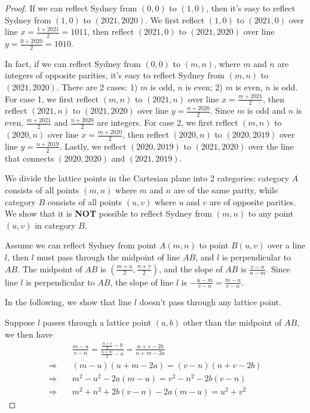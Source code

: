\documentclass[11pt, oneside]{article}   	%
\begin{document}
\begin{proof}
If we can reflect Sydney from $(0, 0)$ to $(1, 0)$, then it's easy to reflect Sydney from $(1, 0)$ to $(2021, 2020)$. We first reflect $(1, 0)$ to $(2021, 0)$ over line $x= \frac{1+ 2021}{2}= 1011$, then reflect $(2021, 0)$ to $(2021, 2020)$ over line $y=\frac{0+ 2020}{2}= 1010$.

In fact, if we can reflect Sydney from $(0, 0)$ to $(m, n)$, where $m$ and $n$ are integers of opposite parities, it's easy to reflect Sydney from $(m, n)$ to $(2021, 2020)$.  There are 2 cases: 1) $m$ is odd, $n$ is even; 2) $m$ is even, $n$ is odd. For case 1, we first reflect $(m, n)$ to $(2021, n)$ over line $x= \frac{m+ 2021}{2}$, then reflect $(2021, n)$ to $(2021, 2020)$ over line $y=\frac{n+ 2020}{2}$. Since $m$ is  odd and $n$ is even, $\frac{m+ 2021}{2}$ and $\frac{n+ 2020}{2}$ are integers. For case 2, we first reflect $(m, n)$ to $(2020, n)$ over line  $x= \frac {m+ 2020}{2}$, then reflect $(2020, n)$ to $(2020, 2019)$ over line $y= \frac{n +2019}{2}$. Lastly, we reflect $(2020, 2019)$ to $(2021, 2020)$ over the line that connects $(2020, 2020)$ and $(2021, 2019)$. 

We divide the lattice points in the Cartesian plane into 2 categories: category $A$ consists of all points $(m, n)$ where $m$ and $n$ are of the same parity, while category $B$ consists of all points $(u, v)$ where $u$ and $v$ are of opposite parities. We show that it is \textbf{NOT}  possible to reflect Sydney from $(m, n)$ to any point $(u, v)$ in category $B$.

Assume we can reflect Sydney from point $A (m, n)$ to point $B (u, v)$ over a line $l$, then $l$ must pass through the midpoint of line $AB$, and $l$ is perpendicular to $AB$. The midpoint of $AB$ is $(\frac{m+u}{2}, \frac{n+v}{2})$, and the slope of $AB$ is $\frac{v-n}{u-m}$. Since line $l$ is perpendicular to $AB$, the slope of line $l$ is $-\frac{u-m}{v-n}=\frac{m-u}{v-n}$. 

In the following, we show that line $l$ doesn't pass through any lattice point.

Suppose $l$ passes through a lattice point $(a, b)$ other than the midpoint of $AB$, we then have 
\begin{align*}
&\frac{m-u}{v-n}= \frac{\frac{n+v}{2}-b} {\frac{u+m}{2}-a}=\frac{n+v-2b}{u+m-2a}\\
\Rightarrow \quad &(m -u)(u+m-2a)= (v-n)(n+v-2b)\\
\Rightarrow \quad &m^2-u^2 -2a(m-u)= v^2 -n^2 -2b(v-n)\\
\Rightarrow \quad &m^2+n^2+2b(v-n)-2a(m-u)=u^2+v^2
\end{align*}


\end{proof}
\end{document}
